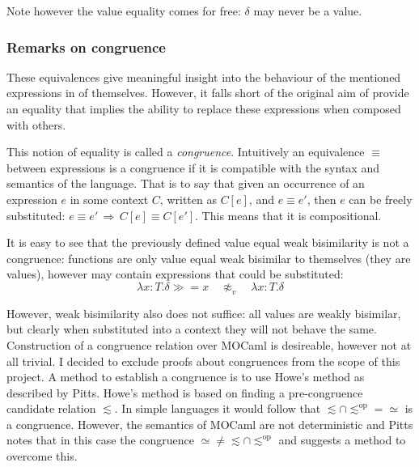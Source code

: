 \documentclass[12pt,twoside,notitlepage]{report}
\theoremstyle{plain}%
\theoremstyle{definition}
\theoremstyle{remark}
\begin{document}
Note however the value equality comes for free: $ \delta $ may never be a value.

\subsubsection{Remarks on congruence}

These equivalences give meaningful insight into the behaviour of the mentioned expressions in of themselves. However, it falls short of the original aim of provide an equality that implies the ability to replace these expressions when composed with others. 

This notion of equality is called a \textit{congruence}. Intuitively an equivalence $ \equiv $ between expressions is a congruence if it is compatible with the syntax and semantics of the language. That is to say that given an occurrence of an expression $ e $ in some context $ C $, written as $ C[e] $, and $ e \equiv e' $, then $ e $ can be freely substituted: $e \equiv e'\, \Rightarrow\, C[e]\equiv C[e'] $. This means that it is compositional.

It is easy to see that the previously defined value equal weak bisimilarity is not a congruence: functions are only  value equal weak bisimilar to themselves (they are values), however may contain expressions that could be substituted:
\[ \lambda x : T. \delta \gg= x\quad \not\approx_v \quad \lambda x : T.\delta \]

However, weak bisimilarity also does not suffice: all values are weakly bisimilar, but clearly when substituted into a context they will not behave the same. 
Construction of a congruence relation over MOCaml is desireable, however not at all trivial. I decided to exclude proofs about congruences from the scope of this project. A method to establish a congruence is to use Howe's method\cite{howe1996proving} as described by Pitts\cite{pitts2011howe}. Howe's method is based on finding a pre-congruence candidate relation $ \lesssim $. In simple languages it would follow that $ \lesssim \cap \lesssim^{\text{op}} = \simeq $ is a congruence. However, the semantics of MOCaml are not deterministic and Pitts notes that in this case the congruence $  \simeq \neq \lesssim \cap \lesssim^{\text{op}} $ and suggests a method to overcome this. 



\end{document}
